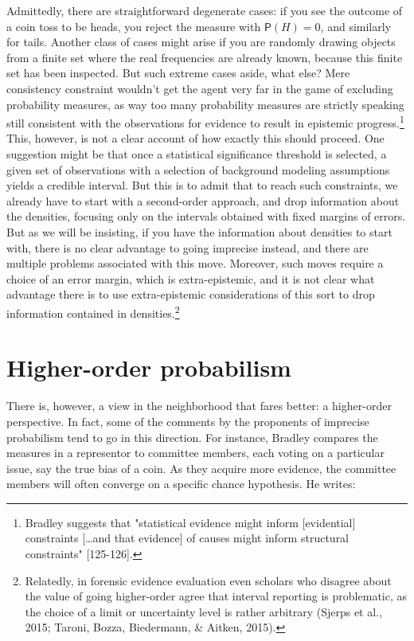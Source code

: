 \documentclass[
  10pt,
  dvipsnames,enabledeprecatedfontcommands]{scrartcl}
\begin{document}
Admittedly, there are straightforward degenerate cases: if you see the
outcome of a coin toss to be heads, you reject the measure with
\(\mathsf{P}(H)=0\), and similarly for tails. Another class of cases
might arise if you are randomly drawing objects from a finite set where
the real frequencies are already known, because this finite set has been
inspected. But such extreme cases aside, what else? Mere consistency
constraint wouldn't get the agent very far in the game of excluding
probability measures, as way too many probability measures are strictly
speaking still consistent with the observations for evidence to result
in epistemic progress.\footnote{
Bradley suggests that "statistical evidence might inform [evidential] constraints [\dots and that evidence] of causes might inform structural constraints" [125-126].}
This, however, is not a clear account of how exactly this should
proceed. One suggestion might be that once a statistical significance
threshold is selected, a given set of observations with a selection of
background modeling assumptions yields a credible interval. But this is
to admit that to reach such constraints, we already have to start with a
second-order approach, and drop information about the densities,
focusing only on the intervals obtained with fixed margins of errors.
But as we will be insisting, if you have the information about densities
to start with, there is no clear advantage to going imprecise instead,
and there are multiple problems associated with this move. Moreover,
such moves require a choice of an error margin, which is
extra-epistemic, and it is not clear what advantage there is to use
extra-epistemic considerations of this sort to drop information
contained in densities.\footnote{Relatedly, in forensic evidence
  evaluation even scholars who disagree about the value of going
  higher-order agree that interval reporting is problematic, as the
  choice of a limit or uncertainty level is rather arbitrary (Sjerps et
  al., 2015; Taroni, Bozza, Biedermann, \& Aitken, 2015).}

\hypertarget{higher-order-probabilism}{%
\section{Higher-order probabilism}\label{higher-order-probabilism}}

There is, however, a view in the neighborhood that fares better: a
higher-order perspective. In fact, some of the comments by the
proponents of imprecise probabilism tend to go in this direction. For
instance, Bradley compares the measures in a representor to committee
members, each voting on a particular issue, say the true bias of a coin.
As they acquire more evidence, the committee members will often converge
on a specific chance hypothesis. He writes:
\end{document}
